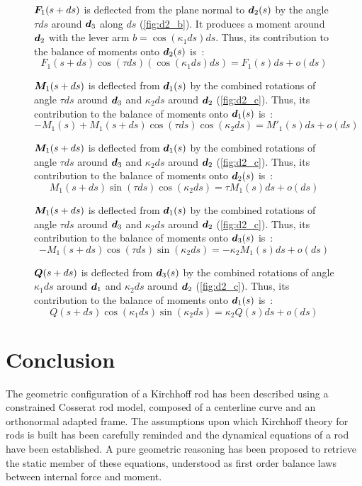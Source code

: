 \begin{figure}[p]
\begin{fullpage}
		$\boldsymbol{F}_1(s+ds)$ is deflected from the plane normal to $\boldsymbol{d}_2(s)$ by the angle $\tau ds$ around $\boldsymbol{d}_3$ along $ds$ (\cref{fig:d2_b}). It produces a moment around $\boldsymbol{d}_2$ with the lever arm $b =  \cos(\kappa_1 ds) ds$. Thus, its contribution to the balance of moments onto $\boldsymbol{d}_2(s)$ is~:
	\begin{equation*}
		F_1(s+ds) \cos(\tau ds) (\cos(\kappa_1 ds) ds) = F_1(s) ds + o(ds)
	\end{equation*}

	$\boldsymbol{M}_1(s+ds)$ is deflected from $\boldsymbol{d}_1(s)$ by the combined rotations of angle $\tau ds$ around $\boldsymbol{d}_3$ and $\kappa_2 ds$ around $\boldsymbol{d}_2$ (\cref{fig:d2_c}). Thus, its contribution to the balance of moments onto $\boldsymbol{d}_1(s)$ is~:
	\begin{equation*}
		-M_1(s) + M_1(s+ds) \cos(\tau ds) \cos(\kappa_2 ds) = M'_1 (s) ds + o(ds)
	\end{equation*}

	$\boldsymbol{M}_1(s+ds)$ is deflected from $\boldsymbol{d}_1(s)$ by the combined rotations of angle $\tau ds$ around $\boldsymbol{d}_3$ and $\kappa_2 ds$ around $\boldsymbol{d}_2$ (\cref{fig:d2_c}). Thus, its contribution to the balance of moments onto $\boldsymbol{d}_2(s)$ is~:
	\begin{equation*}
		M_1(s+ds) \sin(\tau ds) \cos(\kappa_2 ds) = \tau M_1 (s) ds + o(ds)
	\end{equation*}

	$\boldsymbol{M}_1(s+ds)$ is deflected from $\boldsymbol{d}_1(s)$ by the combined rotations of angle $\tau ds$ around $\boldsymbol{d}_3$ and $\kappa_2 ds$ around $\boldsymbol{d}_2$ (\cref{fig:d2_c}). Thus, its contribution to the balance of moments onto $\boldsymbol{d}_3(s)$ is~:
	\begin{equation*}
		-M_1(s+ds) \cos(\tau ds) \sin(\kappa_2 ds) = -\kappa_2 M_1 (s) ds + o(ds)
	\end{equation*}

	$\boldsymbol{Q}(s+ds)$ is deflected from $\boldsymbol{d}_3(s)$ by the combined rotations of angle $\kappa_1 ds$ around $\boldsymbol{d}_1$ and $\kappa_2 ds$ around $\boldsymbol{d}_2$ (\cref{fig:d2_c}). Thus, its contribution to the balance of moments onto $\boldsymbol{d}_1(s)$ is~:
	\begin{equation*}
		Q(s+ds) \cos(\kappa_1 ds) \sin(\kappa_2 ds) = \kappa_2 Q(s) ds + o(ds)
	\end{equation*}
	  \end{fullpage}
\end{figure}

\clearpage
\section{Conclusion}
The geometric configuration of a Kirchhoff rod has been described using a constrained Cosserat rod model, composed of a centerline curve and an orthonormal adapted frame. The assumptions upon which Kirchhoff theory for rods is built has been carefully reminded and the dynamical equations of a rod have been established. A pure geometric reasoning has been proposed to retrieve the static member of these equations, understood as first order balance laws between internal force and moment.

